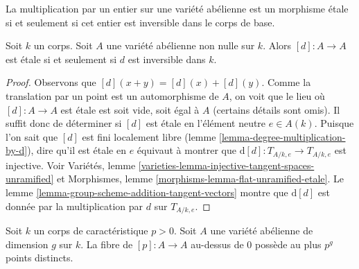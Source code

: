 \begin{lemma}
\label{lemma-abelian-variety-multiplication-by-d-etale}
\begin{slogan}
La multiplication par un entier sur une variété abélienne est un morphisme étale
si et seulement si cet entier est inversible dans le corps de base.
\end{slogan}
Soit $k$ un corps. Soit $A$ une variété abélienne non nulle sur $k$.
Alors $[d] : A \to A$ est \'etale si et seulement si $d$ est inversible dans $k$.
\end{lemma}

\begin{proof}
Observons que $[d](x + y) = [d](x) + [d](y)$. Comme la translation par un
point est un automorphisme de $A$, on voit que le lieu où
$[d] : A \to A$ est \'etale est soit vide, soit égal à $A$ (certains détails
sont omis). Il suffit donc de déterminer si $[d]$ est \'etale en
l'élément neutre $e \in A(k)$. Puisque l'on sait que $[d]$ est fini localement libre
(lemme \ref{lemma-degree-multiplication-by-d}),
dire qu'il est \'etale en $e$ équivaut à
montrer que $\text{d}[d] : T_{A/k, e} \to T_{A/k, e}$ est injective. Voir
Variétés, lemme \ref{varieties-lemma-injective-tangent-spaces-unramified} et
Morphismes, lemme \ref{morphisms-lemma-flat-unramified-etale}.
Le lemme \ref{lemma-group-scheme-addition-tangent-vectors} montre que
$\text{d}[d]$ est donnée par la multiplication par $d$ sur $T_{A/k, e}$.
\end{proof}

\begin{lemma}
\label{lemma-abelian-variety-multiplication-by-p}
Soit $k$ un corps de caractéristique $p > 0$. Soit $A$ une variété abélienne
de dimension $g$
sur $k$. La fibre de $[p] : A \to A$ au-dessus de $0$ possède au plus
$p^g$ points distincts.
\end{lemma}

